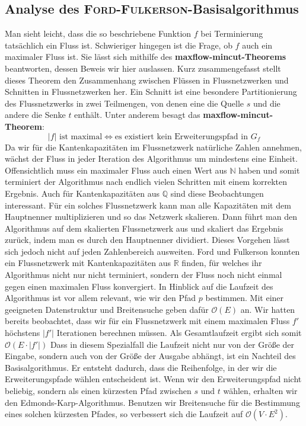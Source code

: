 \documentclass[12pt,a4paper,titlepage,onecolumn,ngerman,bibliography=totocnumbered]{scrartcl}
\theoremstyle{definition}
\theoremstyle{remark}
\newcommand{\ff}{\textsc{Ford-Fulkerson}}
\begin{document}
\subsection{Analyse des \ff -Basisalgorithmus}
Man sieht leicht, dass die so beschriebene Funktion $f$ bei Terminierung tatsächlich ein Fluss ist.
Schwieriger hingegen ist die Frage, ob $f$ auch ein maximaler Fluss ist.
Sie lässt sich mithilfe des \textbf{maxflow-mincut-Theorems} beantworten, dessen Beweis wir hier auslassen.
Kurz zusammengefasst stellt dieses Theorem den Zusammenhang zwischen Flüssen in Flussnetzwerken und Schnitten in Flussnetzwerken her.
Ein Schnitt ist eine besondere Partitionierung des Flussnetzwerks in zwei Teilmengen, von denen eine die Quelle $s$ und die andere die Senke $t$ enthält.
Unter anderem besagt das \textbf{maxflow-mincut-Theorem}:
\begin{equation}
    \lvert f\rvert\text{ ist maximal} \Leftrightarrow \text{es existiert kein Erweiterungspfad in $G_{f}$}
\end{equation}
Da wir für die Kantenkapazitäten im Flussnetzwerk natürliche Zahlen annehmen, wächst der Fluss in jeder Iteration des Algorithmus um mindestens eine Einheit.
Offensichtlich muss ein maximaler Fluss auch einen Wert aus $\mathbb{N}$ haben und somit terminiert der Algorithmus nach endlich vielen Schritten mit einem korrekten Ergebnis.
Auch für Kantenkapazitäten aus $\mathbb{Q}$ sind diese Beobachtungen interessant.
Für ein solches Flussnetzwerk kann man alle Kapazitäten mit dem Hauptnenner multiplizieren und so das Netzwerk \glqq skalieren\grqq{}.
Dann führt man den Algorithmus auf dem skalierten Flussnetzwerk aus und skaliert das Ergebnis zurück, indem man es durch den Hauptnenner dividiert.
Dieses Vorgehen lässt sich jedoch nicht auf jeden Zahlenbereich ausweiten.
Ford und Fulkerson konnten ein Flussnetzwerk mit Kantenkapazitäten aus $\mathbb{R}$ finden, für welches ihr Algorithmus nicht nur nicht terminiert, sondern der Fluss noch nicht einmal gegen einen maximalen Fluss konvergiert.
\medbreak
In Hinblick auf die Laufzeit des Algorithmus ist vor allem relevant, wie wir den Pfad $p$ bestimmen.
Mit einer geeigneten Datenstruktur und Breitensuche geben \cite{Cormen09} dafür $\mathcal{O}(E)$ an.
Wir hatten bereits beobachtet, dass wir für ein Flussnetzwerk mit einem maximalen Fluss $f'$ höchstens $\lvert f'\rvert$ Iterationen berechnen müssen.
Als Gesamtlaufzeit ergibt sich somit $\mathcal{O}(E\cdot\lvert f'\rvert)$
Dass in diesem Spezialfall die Laufzeit nicht nur von der Größe der Eingabe, sondern auch von der Größe der Ausgabe abhängt, ist ein Nachteil des Basisalgorithmus.
Er entsteht dadurch, dass die Reihenfolge, in der wir die Erweiterungspfade wählen entscheident ist.
Wenn wir den Erweiterungspfad nicht beliebig, sondern als einen kürzesten Pfad zwischen $s$ und $t$ wählen, erhalten wir den Edmonds-Karp-Algorithmus.
Benutzen wir Breitensuche für die Bestimmung eines solchen kürzesten Pfades, so verbessert sich die Laufzeit auf $\mathcal{O}(V\cdot E^2)$.
\end{document}
